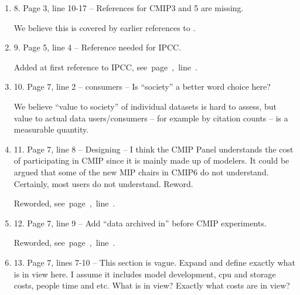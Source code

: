 \documentclass[gmd,manuscript]{copernicus}
\newcommand{\plref}[1]{\mbox{see page \pageref{p-#1}, line
    \lineref{l-#1}.}}
\newenvironment{answer}{\color{blue}}{}
\begin{document}
\begin{enumerate}[label=RC1-\arabic*,leftmargin=*]
  \begin{answer}
    Agreed. We note 2 new MIPs have been added since the first draft
    of this paper, as well as the canonical citation for CMIP6,
    \cite{ref:eyringetal2016a}, which is used in the text. The new
    wording reflects this evolution, \plref{RC1-7}
  \end{answer}
\item 8. Page 3, line 10-17 -- References for CMIP3 and 5 are missing.

  \begin{answer}
    We believe this is covered by earlier references to
    \cite{ref:eyringetal2016a}.
  \end{answer}
\item 9. Page 5, line 4 -- Reference needed for IPCC.

  \begin{answer}
    Added at first reference to IPCC, \plref{RC1-9}
  \end{answer}
\item 10. Page 7, line 2 -- consumers -- Is “society” a better word
  choice here?

  \begin{answer}
    We believe ``value to society'' of individual datasets is hard to
    assess, but value to actual data users/consumers -- for example by
    citation counts -- is a measurable quantity.
  \end{answer}
  
\item 11. Page 7, line 8 -- Designing -- I think the CMIP Panel
  understands the cost of participating in CMIP since it is mainly
  made up of modelers. It could be argued that some of the new MIP
  chairs in CMIP6 do not understand. Certainly, most users do not
  understand. Reword.

  \begin{answer}
    Reworded, \plref{RC1-11}
  \end{answer}
\item 12. Page 7, line 9 -- Add “data archived in” before CMIP
  experiments.

  \begin{answer}
    Reworded, \plref{RC1-12}
  \end{answer}
\item 13. Page 7, lines 7-10 -- This section is vague. Expand and
  define exactly what is in view here. I assume it includes model
  development, cpu and storage costs, people time and etc. What is in
  view? Exactly what costs are in view?


\end{enumerate}
\end{document}
